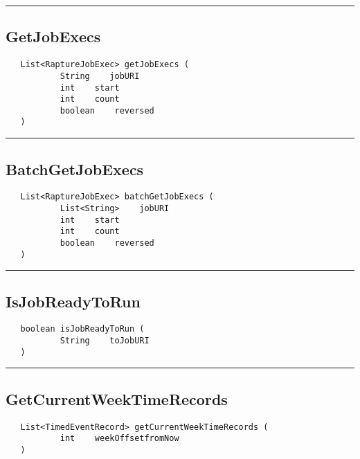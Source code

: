 \rule{15cm}{2pt}
\subsection{GetJobExecs}
\label{Api:GetJobExecs}
\begin{verbatim}
   List<RaptureJobExec> getJobExecs (
           String    jobURI
           int    start
           int    count
           boolean    reversed
   )
\end{verbatim}



\rule{15cm}{2pt}
\subsection{BatchGetJobExecs}
\label{Api:BatchGetJobExecs}
\begin{verbatim}
   List<RaptureJobExec> batchGetJobExecs (
           List<String>    jobURI
           int    start
           int    count
           boolean    reversed
   )
\end{verbatim}



\rule{15cm}{2pt}
\subsection{IsJobReadyToRun}
\label{Api:IsJobReadyToRun}
\begin{verbatim}
   boolean isJobReadyToRun (
           String    toJobURI
   )
\end{verbatim}



\rule{15cm}{2pt}
\subsection{GetCurrentWeekTimeRecords}
\label{Api:GetCurrentWeekTimeRecords}
\begin{verbatim}
   List<TimedEventRecord> getCurrentWeekTimeRecords (
           int    weekOffsetfromNow
   )
\end{verbatim}



